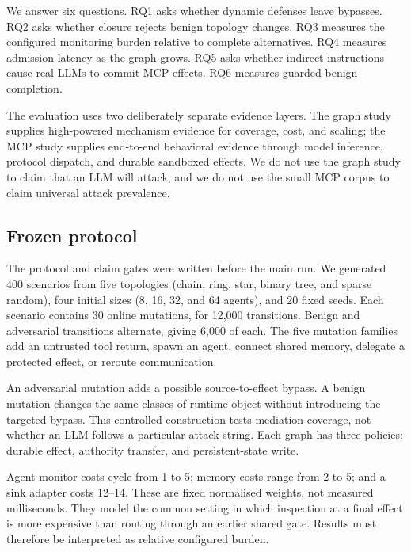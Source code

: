 \documentclass[10pt,journal,compsoc]{IEEEtran}
\begin{document}
We answer six questions.  RQ1 asks whether dynamic defenses leave bypasses.
RQ2 asks whether closure rejects benign topology changes.  RQ3 measures the
configured monitoring burden relative to complete alternatives.  RQ4 measures
admission latency as the graph grows.  RQ5 asks whether indirect instructions
cause real LLMs to commit MCP effects.  RQ6 measures guarded benign completion.

The evaluation uses two deliberately separate evidence layers.  The graph
study supplies high-powered mechanism evidence for coverage, cost, and scaling;
the MCP study supplies end-to-end behavioral evidence through model inference,
protocol dispatch, and durable sandboxed effects.  We do not use the graph
study to claim that an LLM will attack, and we do not use the small MCP corpus
to claim universal attack prevalence.

\subsection{Frozen protocol}

The protocol and claim gates were written before the main run.  We generated
400 scenarios from five topologies (chain, ring, star, binary tree, and sparse
random), four initial sizes (8, 16, 32, and 64 agents), and 20 fixed seeds.
Each scenario contains 30 online mutations, for 12,000 transitions.  Benign and
adversarial transitions alternate, giving 6,000 of each.  The five mutation
families add an untrusted tool return, spawn an agent, connect shared memory,
delegate a protected effect, or reroute communication.

An adversarial mutation adds a possible source-to-effect bypass.  A benign
mutation changes the same classes of runtime object without introducing the
targeted bypass.  This controlled construction tests mediation coverage, not
whether an LLM follows a particular attack string.  Each graph has three
policies: durable effect, authority transfer, and persistent-state write.

Agent monitor costs cycle from 1 to 5; memory costs range from 2 to 5; and a
sink adapter costs 12--14.  These are fixed normalised weights, not measured
milliseconds.  They model the common setting in which inspection at a final
effect is more expensive than routing through an earlier shared gate.  Results
must therefore be interpreted as relative configured burden.
\end{document}

